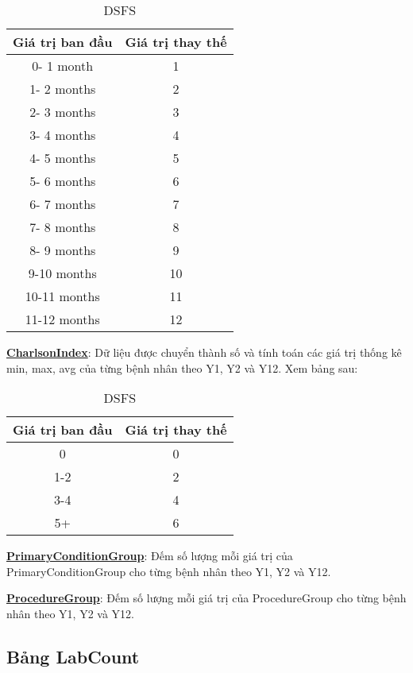 \begin{table}[h!]
    \centering
    \begin{tabular}{||c c||} 
     \hline
     Giá trị ban đầu & Giá trị thay thế \\
     \hline\hline
     0- 1 month & 1 \\
     1- 2 months & 2 \\
     2- 3 months & 3 \\
     3- 4 months & 4 \\
     4- 5 months & 5 \\
     5- 6 months & 6 \\
     6- 7 months & 7 \\
     7- 8 months & 8 \\
     8- 9 months & 9 \\
     9-10 months & 10 \\
     10-11 months & 11 \\
     11-12 months & 12 \\
     \hline
    \end{tabular}
    \caption{DSFS}
    \label{table:1}
\end{table}

\textbf{\underline{CharlsonIndex}}: Dữ liệu được chuyển thành số và tính toán các giá trị thống kê min, max, avg của từng bệnh nhân theo Y1, Y2 và Y12. Xem bảng sau:

\begin{table}[h!]
    \centering
    \begin{tabular}{||c c||} 
     \hline
     Giá trị ban đầu & Giá trị thay thế \\
     \hline\hline
     0 & 0 \\
     1-2 & 2 \\
     3-4 & 4 \\
     5+ & 6 \\
     \hline
    \end{tabular}
    \caption{DSFS}
    \label{table:1}
\end{table}

\textbf{\underline{PrimaryConditionGroup}}: Đếm số lượng mỗi giá trị của PrimaryConditionGroup cho từng bệnh nhân theo Y1, Y2 và Y12.

\textbf{\underline{ProcedureGroup}}: Đếm số lượng mỗi giá trị của ProcedureGroup cho từng bệnh nhân theo Y1, Y2 và Y12.

\subsection{Bảng LabCount}

